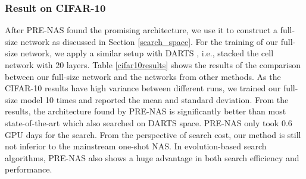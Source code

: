 \documentclass[sigconf]{acmart}
\begin{document}
\subsubsection{Result on CIFAR-10}
After PRE-NAS found the promising architecture, we use it to construct a full-size network as discussed in Section \ref{search_space}. For the training of our full-size network, we apply a similar setup with DARTS \cite{Ref:10}, i.e., stacked the cell network with 20 layers. Table \ref{cifar10results} shows the results of the comparison between our full-size network and the networks from other methods. As the CIFAR-10 results have high variance between different runs, we trained our full-size model 10 times and reported the mean and standard deviation. From the results, the architecture found by PRE-NAS is significantly better than most state-of-the-art which also searched on DARTS space. PRE-NAS only took 0.6 GPU days for the search. From the perspective of search cost, our method is still not inferior to the mainstream one-shot NAS. In evolution-based search algorithms, PRE-NAS also shows a huge advantage in both search efficiency and performance.
\end{document}
